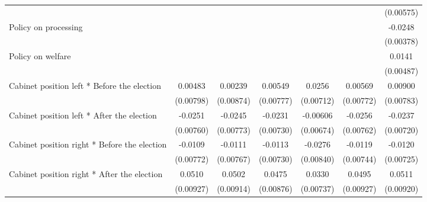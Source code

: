 \begin{table}[htbp]
\begin{tabular}{l*{6}{c}}
                    &                     &                     &                     &                     &                     &   (0.00575)         \\
[1em]
Policy on processing&                     &                     &                     &                     &                     &     -0.0248\sym{***}\\
                    &                     &                     &                     &                     &                     &   (0.00378)         \\
[1em]
Policy on welfare   &                     &                     &                     &                     &                     &      0.0141\sym{**} \\
                    &                     &                     &                     &                     &                     &   (0.00487)         \\
[1em]
Cabinet position left * Before the election&     0.00483         &     0.00239         &     0.00549         &      0.0256\sym{***}&     0.00569         &     0.00900         \\
                    &   (0.00798)         &   (0.00874)         &   (0.00777)         &   (0.00712)         &   (0.00772)         &   (0.00783)         \\
[1em]
Cabinet position left * After the election&     -0.0251\sym{**} &     -0.0245\sym{**} &     -0.0231\sym{**} &    -0.00606         &     -0.0256\sym{**} &     -0.0237\sym{**} \\
                    &   (0.00760)         &   (0.00773)         &   (0.00730)         &   (0.00674)         &   (0.00762)         &   (0.00720)         \\
[1em]
Cabinet position right * Before the election&     -0.0109         &     -0.0111         &     -0.0113         &     -0.0276\sym{**} &     -0.0119         &     -0.0120         \\
                    &   (0.00772)         &   (0.00767)         &   (0.00730)         &   (0.00840)         &   (0.00744)         &   (0.00725)         \\
[1em]
Cabinet position right * After the election&      0.0510\sym{***}&      0.0502\sym{***}&      0.0475\sym{***}&      0.0330\sym{***}&      0.0495\sym{***}&      0.0511\sym{***}\\
                    &   (0.00927)         &   (0.00914)         &   (0.00876)         &   (0.00737)         &   (0.00927)         &   (0.00920)         \\

\end{tabular}
\end{table}
